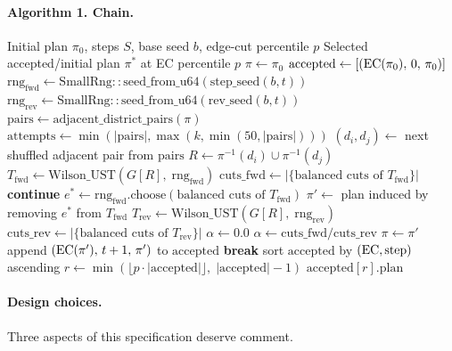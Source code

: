 \paragraph{Algorithm 1. \mergesplit{} Chain.}
\begin{algorithmic}[1]
\Require Initial plan $\pi_0$, steps $S$, base seed $b$, edge-cut percentile $p$
\Ensure  Selected accepted/initial plan $\pi^*$ at EC percentile $p$
\State $\pi \gets \pi_0$
\State $\mathrm{accepted} \gets [(\mathrm{EC}(\pi_0),\,0,\,\pi_0)]$
  \State $\mathrm{rng}_{\mathrm{fwd}} \gets \mathrm{SmallRng::seed\_from\_u64}(\mathrm{step\_seed}(b, t))$
  \State $\mathrm{rng}_{\mathrm{rev}} \gets \mathrm{SmallRng::seed\_from\_u64}(\mathrm{rev\_seed}(b, t))$
  \State $\mathrm{pairs} \gets \mathrm{adjacent\_district\_pairs}(\pi)$
  \State $\mathrm{attempts} \gets \min(|\mathrm{pairs}|,\max(k,\min(50,|\mathrm{pairs}|)))$
    \State $(d_i, d_j) \gets$ next shuffled adjacent pair from $\mathrm{pairs}$
    \State $R \gets \pi^{-1}(d_i) \cup \pi^{-1}(d_j)$
    \State $T_{\mathrm{fwd}} \gets \mathrm{Wilson\_UST}(G[R],\; \mathrm{rng}_{\mathrm{fwd}})$
    \State $\mathrm{cuts\_fwd} \gets |\{\text{balanced cuts of } T_{\mathrm{fwd}}\}|$
     \textbf{continue} \EndIf
    \State $e^* \gets \mathrm{rng}_{\mathrm{fwd}}.\mathrm{choose}(\text{balanced cuts of } T_{\mathrm{fwd}})$
    \State $\pi' \gets$ plan induced by removing $e^*$ from $T_{\mathrm{fwd}}$
    \State $T_{\mathrm{rev}} \gets \mathrm{Wilson\_UST}(G[R],\; \mathrm{rng}_{\mathrm{rev}})$
    \State $\mathrm{cuts\_rev} \gets |\{\text{balanced cuts of } T_{\mathrm{rev}}\}|$
      \State $\alpha \gets 0.0$
    \Else
      \State $\alpha \gets \mathrm{cuts\_fwd} / \mathrm{cuts\_rev}$
    \EndIf
      \State $\pi \gets \pi'$
      \State append $(\mathrm{EC}(\pi'),\,t+1,\,\pi')$ to $\mathrm{accepted}$
    \EndIf
    \State \textbf{break}
  \EndFor
\EndFor
\State sort $\mathrm{accepted}$ by $(\mathrm{EC},\mathrm{step})$ ascending
\State $r \gets \min(\lfloor p \cdot |\mathrm{accepted}|\rfloor,\;|\mathrm{accepted}|-1)$
\State \Return $\mathrm{accepted}[r].\mathrm{plan}$
\end{algorithmic}

\paragraph{Design choices.}
Three aspects of this specification deserve comment.

